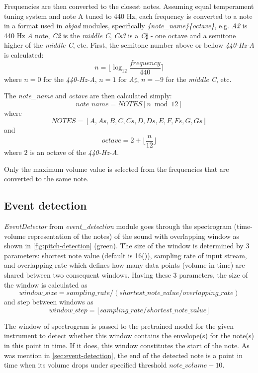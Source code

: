 Frequencies are then converted to the closest notes. Assuming equal temperament tuning system and note A tuned to
440 Hz, each frequency is converted to a note in a format used in \textit{abjad} modules, specifically
\textit{\{note\_name\}\{octave\}}, e.g. \textit{A2} is 440 Hz \textit{A} note, \textit{C2} is the \textit{middle C},
\textit{Cs3} is a \textit{C$\sharp$} - one octave and a semitone higher of the \textit{middle C}, etc. First,
the semitone number above or bellow \textit{440-Hz-A} is calculated:
\[n = \lfloor \log_{12}{\frac{frequency}{440}} \rceil\]
where $n=0$ for the \textit{440-Hz-A}, $n=1$ for \textit{A$\sharp$}, $n=-9$ for the \textit{middle C}, etc.

The \textit{note\_name} and \textit{octave} are then calculated simply:
\[note\_name = NOTES[n \bmod 12]\]
where
\[NOTES = [A, As, B, C, Cs, D, Ds, E, F, Fs, G, Gs]\]
and
\[octave = 2 + \lfloor \frac{n}{12} \rfloor\]
where $2$ is an octave of the \textit{440-Hz-A}.

Only the maximum volume value is selected from the frequencies that are converted to the same note.

\subsection{Event detection}\label{subsec:event-detection}
\textit{EventDetector} from \textit{event\_detection} module goes through the spectrogram (time-volume representation of
the notes) of the sound with overlapping window as shown in \cref{fig:pitch-detection} (green). The size of the window
is determined by 3 parameters: shortest note value (default is 16(\Sech)), sampling rate of input stream, and
overlapping rate which defines how many data points (volume in time) are shared between two consequent windows. Having
these 3 parameters, the size of the window is calculated as
\[window\_size = sampling\_rate / (shortest\_note\_value / overlapping\_rate)\]
and step between windows as
\[window\_step = \lfloor{sampling\_rate / shortest\_note\_value}\rfloor\]

The window of spectrogram is passed to the pretrained model for the given instrument to detect whether this window
contains the envelope(s) for the note(s) in this point in time. If it does, this window constitutes the start of
the note. As was mention in \cref{sec:event-detection}, the end of the detected note is a point in time when its volume
drops under specified threshold $note\_volume-10$.

